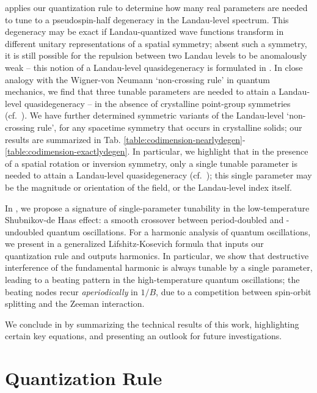 \documentclass[aps, showpacs, twocolumn, notitlepage, superscriptaddress]{revtex4-1}
\begin{document}
{ applies} our quantization rule to determine how many real parameters are needed to tune to a {pseudo}spin-half degeneracy in the Landau-level spectrum. {This degeneracy may be exact if Landau-quantized wave functions transform in different unitary representations of a spatial symmetry; absent such a symmetry,} it is still possible for the repulsion between two Landau levels to be anomalously weak -- this notion of a Landau-level quasidegeneracy is formulated in . In close analogy with the Wigner-von Neumann `non-crossing rule' in quantum mechanics\cite{neumann2000behaviour}, we find that three tunable parameters are needed to attain a Landau-level quasidegeneracy -- in the absence of crystalline point-group symmetries (cf.\ ). 
We have further determined symmetric variants of the Landau-level ‘non-crossing rule’, for any spacetime symmetry that occurs in crystalline solids; our results are summarized in Tab.  \ref{table:codimension-nearlydegen}-\ref{table:codimension-exactlydegen}. In particular, we highlight that in the presence of a spatial rotation or inversion symmetry,  only a single tunable parameter is needed to attain a Landau-level quasidegeneracy (cf.\ ); this single parameter may be the magnitude or orientation of the field, or the Landau-level index itself.


In , we propose a signature of single-parameter tunability in the low-temperature Shubnikov-de Haas effect\cite{SdH}: a smooth crossover between period-doubled and -undoubled quantum oscillations. For a harmonic analysis of  quantum oscillations, we present in  a generalized Lifshitz-Kosevich formula that inputs our quantization rule and outputs harmonics. In particular, we show that destructive interference of the fundamental harmonic is always tunable by a single parameter, leading to a beating pattern in the high-temperature quantum oscillations; the beating nodes recur \textit{aperiodically} in $1/B$, due to a competition between spin-orbit splitting and the Zeeman interaction. 

We conclude in  by summarizing  the technical results of this work, highlighting certain key equations, and presenting an outlook for future investigations.

\section{Quantization Rule\label{sec:qtznrules}}
\end{document}
